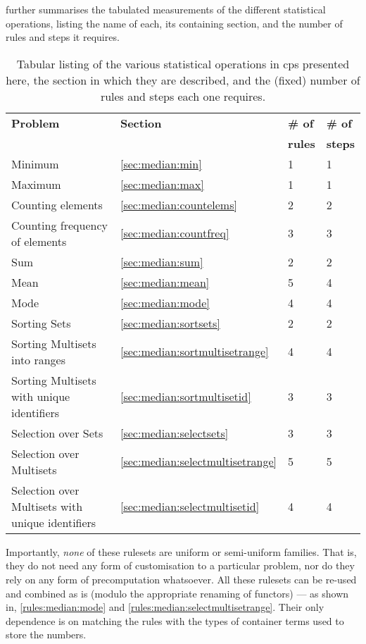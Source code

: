  further summarises the tabulated measurements of the different statistical operations, listing the name of each, its containing section, and the number of rules and steps it requires.

\begin{table}[htbp] \centering
   \begin{tabular}{|l|l|l|l|}
    \hline
    \textbf{Problem} & \textbf{Section} & \textbf{\# of} & \textbf{\# of}\\&& \textbf{rules} & \textbf{steps}\\ \hline
    Minimum & \ref{sec:median:min} & 1 & 1 \\ %
    Maximum & \ref{sec:median:max} & 1 & 1 \\ \hline
    Counting elements & \ref{sec:median:countelems} & 2 & 2 \\ %
    Counting frequency of elements & \ref{sec:median:countfreq} & 3 & 3 \\ \hline
    Sum & \ref{sec:median:sum} & 2 & 2 \\ %
    Mean & \ref{sec:median:mean} & 5 & 4 \\ %
    Mode & \ref{sec:median:mode} & 4 & 4 \\ \hline
    Sorting Sets & \ref{sec:median:sortsets} & 2 & 2 \\ %
    Sorting Multisets into ranges & \ref{sec:median:sortmultisetrange} & 4 & 4 \\ %
    Sorting Multisets with unique identifiers & \ref{sec:median:sortmultisetid} & 3 & 3 \\ \hline
    Selection over Sets & \ref{sec:median:selectsets} & 3 & 3 \\ %
    Selection over Multisets & \ref{sec:median:selectmultisetrange} & 5 & 5 \\ %
    Selection over Multisets with unique identifiers & \ref{sec:median:selectmultisetid} & 4 & 4 \\ \hline
\end{tabular} 
\caption[Listing of various statistical operations in \gls{cps}]{\label{tab:median:summary}Tabular listing of the various statistical operations in \gls{cps} presented here, the section in which they are described, and the (fixed) number of rules and steps each one requires.}
\end{table}

Importantly, \emph{none} of these \glspl{ruleset} are uniform or semi-uniform families.  That is, they do not need any form of customisation to a particular problem, nor do they rely on any form of precomputation whatsoever.  All these \glspl{ruleset} can be re-used and combined as is (modulo the appropriate renaming of \glspl{functor}) --- as shown in, \eg{} \cref{rules:median:mode} and \cref{rules:median:selectmultisetrange}.  Their only dependence is on matching the rules with the types of container terms used to store the numbers.

